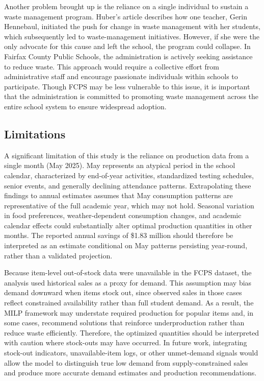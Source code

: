 \documentclass[journal]{IEEEtran}
\begin{document}
Another problem brought up is the reliance on a single individual to sustain a waste management program. Huber’s article \cite{huber} describes how one teacher, Gerin Hennebaul, initiated the push for change in waste management with her students, which subsequently led to waste-management initiatives. However, if she were the only advocate for this cause and left the school, the program could collapse. In Fairfax County Public Schools, the administration is actively seeking assistance to reduce waste. This approach would require a collective effort from administrative staff and encourage passionate individuals within schools to participate. Though FCPS may be less vulnerable to this issue, it is important that the administration is committed to promoting waste management across the entire school system to ensure widespread adoption.

\subsection{Limitations}
A significant limitation of this study is the reliance on production data from a single month (May 2025). May represents an atypical period in the school calendar, characterized by end-of-year activities, standardized testing schedules, senior events, and generally declining attendance patterns. Extrapolating these findings to annual estimates assumes that May consumption patterns are representative of the full academic year, which may not hold. Seasonal variation in food preferences, weather-dependent consumption changes, and academic calendar effects could substantially alter optimal production quantities in other months. The reported annual savings of \$1.83 million should therefore be interpreted as an estimate conditional on May patterns persisting year-round, rather than a validated projection.

Because item-level out-of-stock data were unavailable in the FCPS dataset, the analysis used historical sales as a proxy for demand. This assumption may bias demand downward when items stock out, since observed sales in those cases reflect constrained availability rather than full student demand. As a result, the MILP framework may understate required production for popular items and, in some cases, recommend solutions that reinforce underproduction rather than reduce waste efficiently. Therefore, the optimized quantities should be interpreted with caution where stock-outs may have occurred. In future work, integrating stock-out indicators, unavailable-item logs, or other unmet-demand signals would allow the model to distinguish true low demand from supply-constrained sales and produce more accurate demand estimates and production recommendations. 
\end{document}
